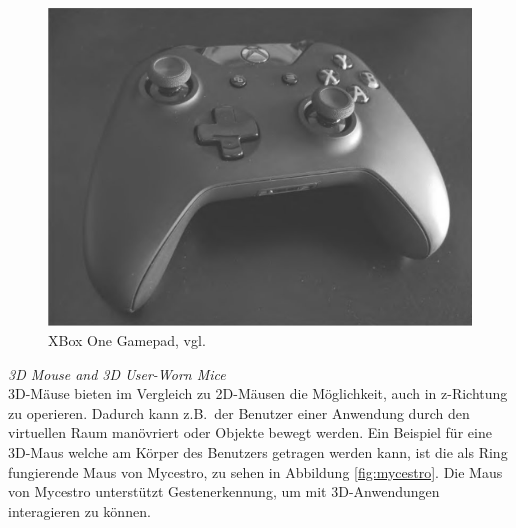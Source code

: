 \begin{figure}[h]
\captionsetup{width=.7\linewidth}
\includegraphics[scale=0.5]{Bilder/Hauptteil/xboxonegamepad}
\centering
\caption{XBox One Gamepad, vgl.~\citep{modernworldinputdevices}}
\label{fig:xboxonegamepad}
\end{figure}

\noindent \textit{3D Mouse and 3D User-Worn Mice}\\
3D-Mäuse bieten im Vergleich zu 2D-Mäusen die Möglichkeit, auch in z-Richtung zu operieren. Dadurch kann z.B.~der Benutzer einer Anwendung durch den virtuellen Raum manövriert oder Objekte bewegt werden. Ein Beispiel für eine 3D-Maus welche am Körper des Benutzers getragen werden kann, ist die als Ring fungierende Maus von Mycestro, zu sehen in Abbildung \ref{fig:mycestro}. Die Maus von Mycestro unterstützt Gestenerkennung, um mit 3D-Anwendungen interagieren zu können.\\

